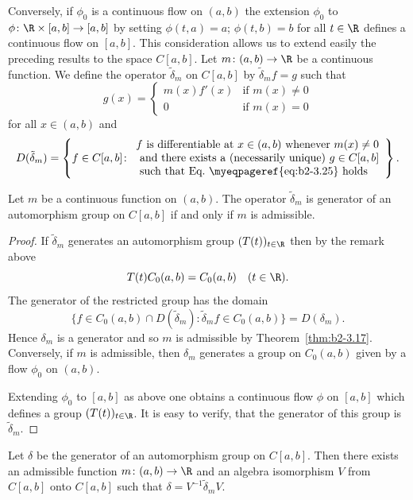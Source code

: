 Conversely, if\/ $\phi_{0}$ is a continuous flow on $(a,b)$ the extension $\phi_{0}$ to $\phi \colon \R \times [a,b] \to [a,b]$ by setting $\phi(t,a) = a$; $\phi(t,b) = b$ for all $t \in \R$ defines a continuous flow on $[a,b]$.
This consideration allows us to extend easily the preceding results to the space $C[a,b]$.
Let $m \colon (a,b) \to \R$ be a continuous function.
We define the operator $\widetilde{\delta}_{m}$ on $C[a,b]$ by $\widetilde{\delta}_{m}f = g$ such that
\begin{equation}\label{eq:b2-3.25}
g(x) = \begin{cases}
    m(x)f'(x) & \text{if } m(x) \neq 0 \\
    0 & \text{if } m(x) = 0
\end{cases}
\end{equation}
for all $x \in (a,b)$ and 
\[
D(\tilde{\delta}_{m}) = \left\{ f \in C[a,b] \colon 
\begin{array}{l}
f \text{ is differentiable at } x \in (a,b) \text{ whenever } m(x) \neq 0 \\ 
\text{ and there exists a (necessarily unique) } g \in C[a,b] \\
\text{ such that Eq.~\myeqpageref{eq:b2-3.25} holds} 
\end{array} \right\}.
\qedhere
\]
\begin{theorem}\label{thm:b2-3.26}
%
Let $m$ be a continuous function on $(a,b)$.
The operator $\tilde{\delta}_{m}$ is generator of an automorphism group on $C[a,b]$ if and only if\/ $m$ is admissible.
\end{theorem}
\begin{proof}
If\/ $\tilde{\delta}_{m}$ generates an automorphism group $(T(t))_{t \in \R}$ then by the remark above 
%
\[
	T(t)C_{0}(a,b) = C_{0}(a,b) \quad (t \in \R) .
\]
%
The generator of the restricted group has the domain 
%
\[
	\{ f \in C_{0}(a,b) \cap D(\tilde{\delta}_{m}) 
		\colon \tilde{\delta}_{m}f \in C_{0}(a,b) \} = D(\delta_{m}) .
\]
%
Hence $\delta_{m}$ is a generator and so $m$ is admissible by Theorem~\ref{thm:b2-3.17}.
Conversely, if\/ $m$ is admissible, then $\delta_{m}$ generates a group on $C_{0}(a,b)$ given by a flow $\phi_{0}$ on $(a,b)$.

Extending $\phi_{0}$ to $[a,b]$ as above one obtains a continuous flow $\phi$ on $[a,b]$ which defines a group $(T(t))_{t \in \R}$.
It is easy to verify, that the generator of this group is $\tilde{\delta}_{m}$.
\end{proof}
\begin{theorem}\label{thm:b2-3.27}
%
Let $\delta$ be the generator of an automorphism group on $C[a,b]$.
Then there exists an admissible function $m \colon (a,b) \to \R$ and an algebra isomorphism $V$ from $C[a,b]$ onto $C[a,b]$ such that $\delta = V^{-1}\tilde{\delta}_{m}V$.
\end{theorem}

